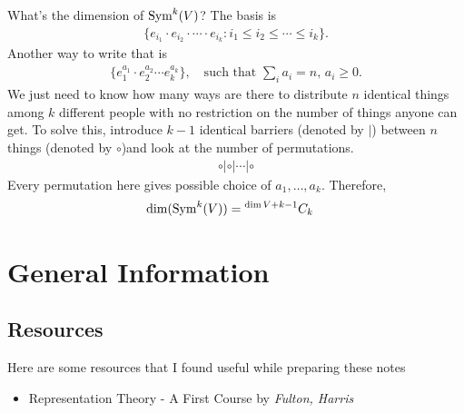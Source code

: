 What's the dimension of $\operatorname{Sym}^k(V)$? The basis is
\begin{align}
    \{e_{i_1}\cdot e_{i_2} \cdot\cdots \cdot e_{i_k} : i_1 \leq i_2 \leq \cdots \leq i_k \}.
\end{align}
Another way to write that is
\begin{align}
    \{e_1^{a_1}\cdot e_2^{a_2} \cdots e_k^{a_k}\},\quad\text{such that } \sum_i a_i = n,\, a_i\geq 0.
\end{align}
We just need to know how many ways are there to distribute $n$ identical things among $k$ different people with no restriction on the number of things anyone can get. To solve this, introduce $k-1$ identical barriers (denoted by $|$) between $n$ things (denoted by $\circ$)and look at the number of permutations.
\begin{align}
    \circ | \circ | \cdots | \circ
\end{align}
Every permutation here gives possible choice of ${a_1,\dotsc,a_k}$. Therefore,
\begin{align}
    \dim (\operatorname{Sym}^k (V)) &= {}^{\dim V +k-1}C_{k}
    \label{eqn:dim_symmetricpower}
\end{align}


\chapter{General Information}

\section{Resources}
\label{sec:Resources}
Here are some resources that I found useful while preparing these notes
\begin{itemize}
    \item Representation Theory - A First Course by \emph{Fulton, Harris}
\end{itemize}


